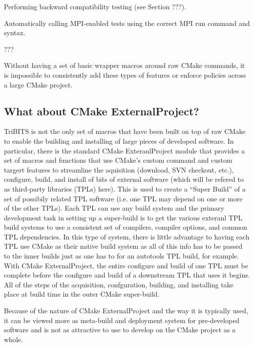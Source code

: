 \documentclass[note]{TechNote}
\begin{document}
\begin{compactitem}
\item Performing backward compatibility testing (see Section ???).
\item Automatically calling MPI-enabled tests using the correct MPI run command and syntax.
\item ???
\end{compactitem}

Without having a set of basic wrapper macros around raw CMake commands, it is impossible to consistently add these types of features or enforce policies across a large CMake project.

%
\subsection{What about CMake ExternalProject?}
\label{sec:what_about_cmake_externalproject}
%

TriBITS is not the only set of macros that have been built on top of raw CMake to enable the building and installing of large pieces of developed software.  In particular, there is the standard CMake ExteranlProject module that provides a set of macros and functions that use CMake's custom command and custom targert features to streamline the aquisition (download, SVN checkout, etc.), configure, build, and install of bits of external software (which will be refered to as third-party libraries (TPLs) here).  This is used to create a ``Super Build'' of a set of possibily related TPL software (i.e. one TPL may depend on one or more of the other TPLs).  Each TPL can use any build system and the primary development task in setting up a super-build is to get the various exteranl TPL build systems to use a consistent set of compilers, compiler options, and common TPL dependencies.  In this type of system, there is little advantage to having each TPL use CMake as their native build system as all of this info has to be passed to the inner builds just as one has to for an autotools TPL build, for example.  With CMake ExternalProject, the entire configure and build of one TPL must be complete before the configure and build of a downstream TPL that uses it begins.  All of the steps of the acquisition, confguration, building, and installing take place at build time in the outer CMake super-build.

Because of the nature of CMake ExternalProject and the way it is typically used, it can be viewed more as meta-build and deployment system for pre-developed software and is not as attractive to use to develop on the CMake project as a whole.
\end{document}

